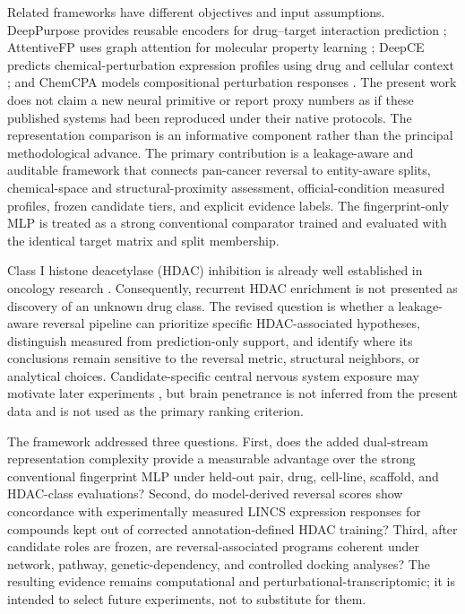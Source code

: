 \begin{roundtworevision}
Related frameworks have different objectives and input assumptions. DeepPurpose provides reusable encoders for drug--target interaction prediction \cite{huang2021deeppurpose}; AttentiveFP uses graph attention for molecular property learning \cite{xiong2019attentivefp}; DeepCE predicts chemical-perturbation expression profiles using drug and cellular context \cite{nguyen2021deepce}; and ChemCPA models compositional perturbation responses \cite{hetzel2022chemcpa}. The present work does not claim a new neural primitive or report proxy numbers as if these published systems had been reproduced under their native protocols. The representation comparison is an informative component rather than the principal methodological advance. The primary contribution is a leakage-aware and auditable framework that connects pan-cancer reversal to entity-aware splits, chemical-space and structural-proximity assessment, official-condition measured profiles, frozen candidate tiers, and explicit evidence labels. The fingerprint-only MLP is treated as a strong conventional comparator trained and evaluated with the identical target matrix and split membership.
\end{roundtworevision}

\begin{minorrevision}
Class I histone deacetylase (HDAC) inhibition is already well established in oncology research \cite{johnstone2002,bolden2006,bradner2010}. Consequently, recurrent HDAC enrichment is not presented as discovery of an unknown drug class. The revised question is whether a leakage-aware reversal pipeline can prioritize specific HDAC-associated hypotheses, distinguish measured from prediction-only support, and identify where its conclusions remain sensitive to the reversal metric, structural neighbors, or analytical choices. Candidate-specific central nervous system exposure may motivate later experiments \cite{wagner2010,mcclure2018}, but brain penetrance is not inferred from the present data and is not used as the primary ranking criterion.\par
\end{minorrevision}

\begin{roundtworevision}
The framework addressed three questions. First, does the added dual-stream representation complexity provide a measurable advantage over the strong conventional fingerprint MLP under held-out pair, drug, cell-line, scaffold, and HDAC-class evaluations? Second, do model-derived reversal scores show concordance with experimentally measured LINCS expression responses for compounds kept out of corrected annotation-defined HDAC training? Third, after candidate roles are frozen, are reversal-associated programs coherent under network, pathway, genetic-dependency, and controlled docking analyses? The resulting evidence remains computational and perturbational-transcriptomic; it is intended to select future experiments, not to substitute for them.
\end{roundtworevision}

